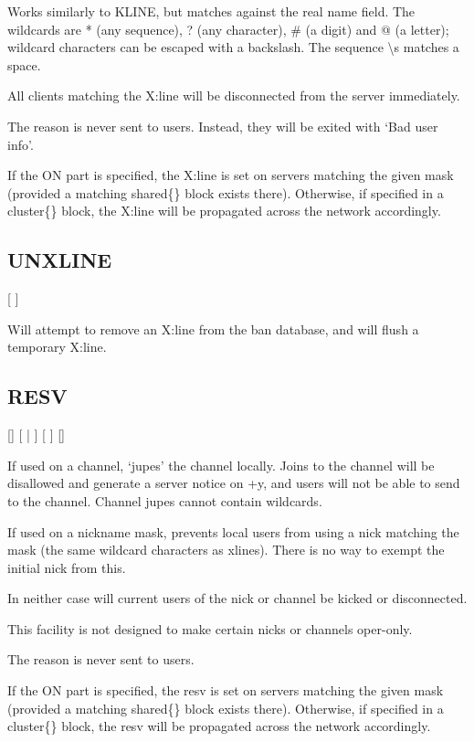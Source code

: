 	Works similarly to KLINE, but matches against the real name field. The
	wildcards are * (any sequence), ? (any character), \# (a digit) and @
	(a letter); wildcard characters can be escaped with a backslash. The
	sequence \textbackslash{}s matches a space.

	All clients matching the X:line will be disconnected from the server
	immediately.

	The reason is never sent to users. Instead, they will be exited with
	`Bad user info'.

	If the ON part is specified, the X:line is set on servers matching the
	given mask (provided a matching shared\{\} block exists there).
	Otherwise, if specified in a cluster\{\} block, the X:line will be
	propagated across the network accordingly.

\subsection{UNXLINE}

	 [ ]

	Will attempt to remove an X:line from the ban database, and will
	flush a temporary X:line.

\subsection{RESV}

	[] [ | ]
	[ ] [\literal{:}]

	If used on a channel, `jupes' the channel locally. Joins to the
	channel will be disallowed and generate a server notice on +y, and
	users will not be able to send to the channel. Channel jupes cannot
	contain wildcards.

	If used on a nickname mask, prevents local users from using a nick
	matching the mask (the same wildcard characters as xlines). There is
	no way to exempt the initial nick from this.

	In neither case will current users of the nick or channel be kicked or
	disconnected.

	This facility is not designed to make certain nicks or channels
	oper-{}only.

	The reason is never sent to users.

	If the ON part is specified, the resv is set on servers matching the
	given mask (provided a matching shared\{\} block exists there).
	Otherwise, if specified in a cluster\{\} block, the resv will be
	propagated across the network accordingly.

